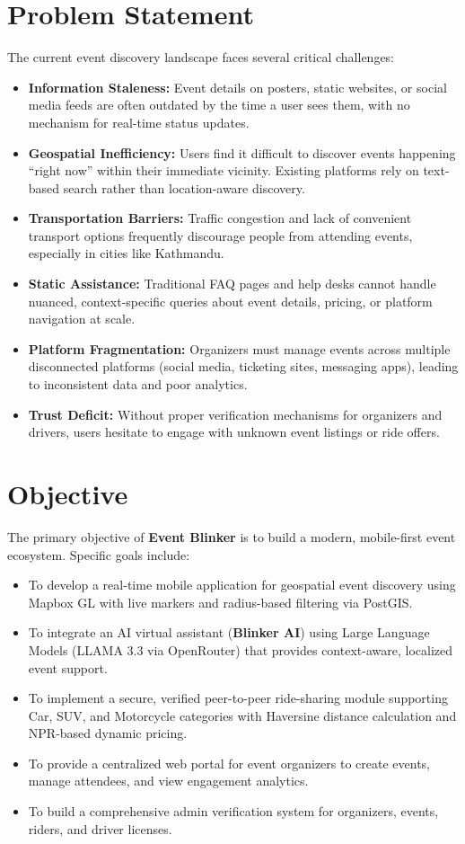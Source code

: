 \section{Problem Statement}
The current event discovery landscape faces several critical challenges:
\begin{itemize}
    \item \textbf{Information Staleness:} Event details on posters, static websites, or social media feeds are often outdated by the time a user sees them, with no mechanism for real-time status updates.
    \item \textbf{Geospatial Inefficiency:} Users find it difficult to discover events happening ``right now'' within their immediate vicinity. Existing platforms rely on text-based search rather than location-aware discovery.
    \item \textbf{Transportation Barriers:} Traffic congestion and lack of convenient transport options frequently discourage people from attending events, especially in cities like Kathmandu.
    \item \textbf{Static Assistance:} Traditional FAQ pages and help desks cannot handle nuanced, context-specific queries about event details, pricing, or platform navigation at scale.
    \item \textbf{Platform Fragmentation:} Organizers must manage events across multiple disconnected platforms (social media, ticketing sites, messaging apps), leading to inconsistent data and poor analytics.
    \item \textbf{Trust Deficit:} Without proper verification mechanisms for organizers and drivers, users hesitate to engage with unknown event listings or ride offers.
\end{itemize}

\section{Objective}
The primary objective of \textbf{Event Blinker} is to build a modern, mobile-first event ecosystem. Specific goals include:
\begin{itemize}
    \item To develop a real-time mobile application for geospatial event discovery using Mapbox GL with live markers and radius-based filtering via PostGIS.
    \item To integrate an AI virtual assistant (\textbf{Blinker AI}) using Large Language Models (LLAMA 3.3 via OpenRouter) that provides context-aware, localized event support.
    \item To implement a secure, verified peer-to-peer ride-sharing module supporting Car, SUV, and Motorcycle categories with Haversine distance calculation and NPR-based dynamic pricing.
    \item To provide a centralized web portal for event organizers to create events, manage attendees, and view engagement analytics.
    \item To build a comprehensive admin verification system for organizers, events, riders, and driver licenses.
\end{itemize}

